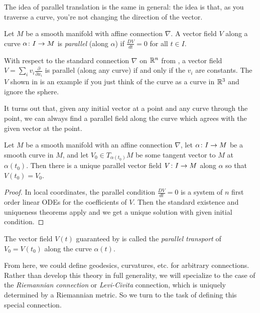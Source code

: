 The idea of parallel translation is the same in general: the idea is that, as you traverse a curve, you're not changing the direction of the vector.

\begin{definition}\label{def:parallel vector field}
	Let $M$ be a smooth manifold with affine connection $\nabla$. A vector field $V$ along a curve $\alpha \colon\thinspace\! I \to M$ is \emph{parallel} (along $\alpha$) if $\frac{DV}{dt} = 0$ for all $t \in I$.
\end{definition}

\begin{example}
	With respect to the standard connection $\nabla$ on $\mathbb{R}^n$ from , a vector field $V = \sum_i v_i \frac{\partial}{\partial x_i}$ is parallel (along any curve) if and only if the $v_i$ are constants. The $V$ shown in  is an example if you just think of the curve as a curve in $\mathbb{R}^3$ and ignore the sphere.
\end{example}

It turns out that, given any initial vector at a point and any curve through the point, we can always find a parallel field along the curve which agrees with the given vector at the point.

\begin{proposition}\label{prop:parallel transport}
	Let $M$ be a smooth manifold with an affine connection $\nabla$, let $\alpha \colon\thinspace\! I \to M$ be a smooth curve in $M$, and let $V_0 \in T_{\alpha(t_0)}M$ be some tangent vector to $M$ at $\alpha(t_0)$. Then there is a unique parallel vector field $V \colon\thinspace\! I \to M$ along $\alpha$ so that $V(t_0) = V_0$.
\end{proposition}

\begin{proof}
	In local coordinates, the parallel condition $\frac{DV}{dt} = 0$ is a system of $n$ first order linear ODEs for the coefficients of $V$. Then the standard existence and uniqueness theorems apply and we get a unique solution with given initial condition.
\end{proof}

\begin{definition}\label{def:parallel transport}
	The vector field $V(t)$ guaranteed by  is called the \emph{parallel transport} of $V_0 = V(t_0)$ along the curve $\alpha(t)$.
\end{definition}

From here, we could define geodesics, curvatures, etc. for arbitrary connections. Rather than develop this theory in full generality, we will specialize to the case of the \emph{Riemannian connection} or \emph{Levi-Civita} connection, which is uniquely determined by a Riemannian metric. So we turn to the task of defining this special connection.